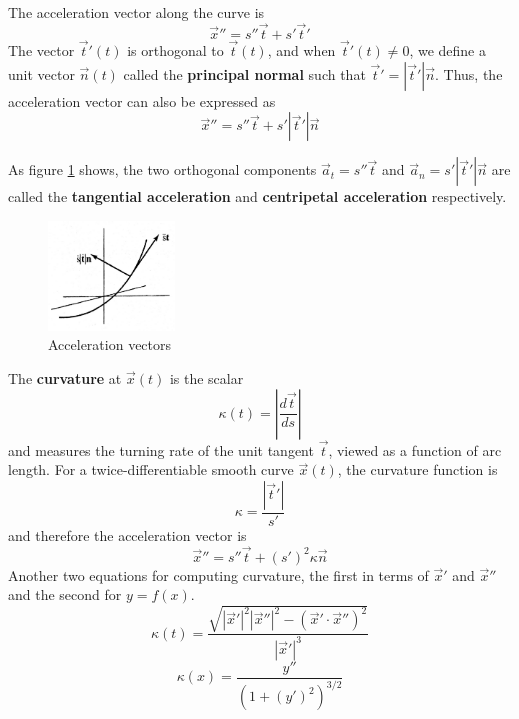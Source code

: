 \documentclass[11pt]{article}
\begin{document}
	The acceleration vector along the curve is
	\begin{equation}
		\vec{x}'' = s''\vec{t} + s'\vec{t}'
	\end{equation}
	The vector $\vec{t}'(t)$ is orthogonal to $\vec{t}(t)$, and when $\vec{t}'(t) \neq 0$, we define a unit vector $\vec{n}(t)$ called the \textbf{principal normal} such that $\vec{t}' = |\vec{t}'|\vec{n}$. Thus, the acceleration vector can also be expressed as
	\begin{equation}
		\vec{x}'' = s''\vec{t} + s'|\vec{t}'|\vec{n}
	\end{equation}
	
	As figure \ref{fig:normal} shows, the two orthogonal components $\vec{a}_t = s''\vec{t}$ and $\vec{a}_n = s'|\vec{t}'|\vec{n}$ are called the \textbf{tangential acceleration} and \textbf{centripetal acceleration} respectively.
	
	\begin{figure}[htb]
		\centering
		\includegraphics[width=0.3\textwidth]{normal.png}
		\caption{Acceleration vectors}
		\label{fig:normal}
	\end{figure}
	
	The \textbf{curvature} at $\vec{x}(t)$ is the scalar
	\begin{equation}
		\kappa(t) = \left| \frac{d\vec{t}}{ds} \right|
	\end{equation}
	and measures the turning rate of the unit tangent $\vec{t}$, viewed as a function of arc length. For a twice-differentiable smooth curve $\vec{x}(t)$, the curvature function is
	\begin{equation}
		\kappa = \frac{|\vec{t}'|}{s'}
	\end{equation}
	and therefore the acceleration vector is
	\begin{equation}
		\vec{x}'' = s''\vec{t} + (s')^2\kappa \vec{n}
	\end{equation}
	Another two equations for computing curvature, the first in terms of $\vec{x}'$ and $\vec{x}''$ and the second for $y = f(x)$.
	\begin{equation}
		\kappa(t) = \frac{\sqrt{|\vec{x}'|^2 |\vec{x}''|^2 - (\vec{x}' \cdot \vec{x}'')^2}}{|\vec{x}'|^3}
	\end{equation}
	\begin{equation}
		\kappa(x) = \frac{y''}{(1 + (y')^2)^{3/2}}
	\end{equation}
	
\end{document}

